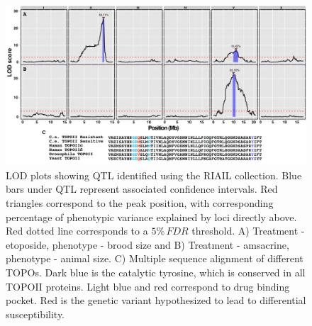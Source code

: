 \documentclass[12pt]{article}
\begin{document}
\begin{figure}[h]
\centering
\captionsetup{font=tiny}
\includegraphics[scale=0.45]{Figures/Figure1.pdf}
\vspace{-5pt}
\caption[LOD plots for TOPOII poisons]{LOD plots showing QTL identified using the RIAIL collection. Blue bars under QTL represent associated confidence intervals. Red triangles correspond to the peak position, with corresponding percentage of phenotypic variance explained by loci directly above. Red dotted line corresponds to a $5\%\,FDR$ threshold. A) Treatment - etoposide, phenotype - brood size and B) Treatment - amsacrine, phenotype - animal size. C) Multiple sequence alignment of different TOPOs. Dark blue is the catalytic tyrosine, which is conserved in all TOPOII proteins. Light blue and red correspond to drug binding pocket. Red is the genetic variant hypothesized to lead to differential susceptibility.}
\label{LODplot}
\end{figure}
\newpage

\end{document}
